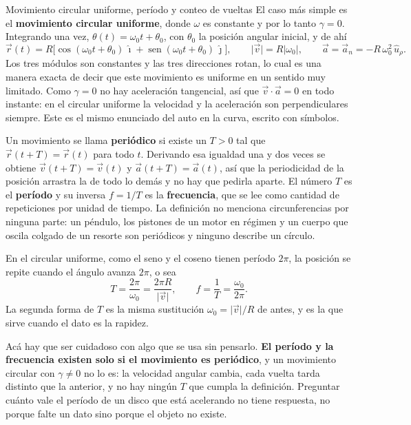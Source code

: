 \documentclass[11pt,openany]{book}
\newcommand{\sen}{\operatorname{sen}}
\begin{document}
\begin{bloque}{Movimiento circular uniforme, período y conteo de vueltas}
El caso más simple es el \textbf{movimiento circular uniforme}, donde $\omega$ es constante y por lo tanto $\gamma = 0$. Integrando una vez, $\theta(t) = \omega_0 t + \theta_0$, con $\theta_0$ la posición angular inicial, y de ahí
\[
\vec r(t) = R\big[\cos(\omega_0t+\theta_0)\,\hat\imath + \sen(\omega_0t+\theta_0)\,\hat\jmath\big],
\qquad
\lvert\vec v\rvert = R\lvert\omega_0\rvert, \qquad \vec a = \vec a_n = -R\,\omega_0^2\,\hat u_\rho.
\]
Los tres módulos son constantes y las tres direcciones rotan, lo cual es una manera exacta de decir que este movimiento es uniforme en un sentido muy limitado. Como $\gamma = 0$ no hay aceleración tangencial, así que $\vec v\cdot\vec a = 0$ en todo instante: en el circular uniforme la velocidad y la aceleración son perpendiculares siempre. Este es el mismo enunciado del auto en la curva, escrito con símbolos.

Un movimiento se llama \textbf{periódico} si existe un $T > 0$ tal que $\vec r(t+T) = \vec r(t)$ para todo $t$. Derivando esa igualdad una y dos veces se obtiene $\vec v(t+T) = \vec v(t)$ y $\vec a(t+T) = \vec a(t)$, así que la periodicidad de la posición arrastra la de todo lo demás y no hay que pedirla aparte. El número $T$ es el \textbf{período} y su inversa $f = 1/T$ es la \textbf{frecuencia}, que se lee como cantidad de repeticiones por unidad de tiempo. La definición no menciona circunferencias por ninguna parte: un péndulo, los pistones de un motor en régimen y un cuerpo que oscila colgado de un resorte son periódicos y ninguno describe un círculo.

En el circular uniforme, como el seno y el coseno tienen período $2\pi$, la posición se repite cuando el ángulo avanza $2\pi$, o sea
\[
T = \frac{2\pi}{\omega_0} = \frac{2\pi R}{\lvert\vec v\rvert}, \qquad f = \frac{1}{T} = \frac{\omega_0}{2\pi}.
\]
La segunda forma de $T$ es la misma sustitución $\omega_0 = \lvert\vec v\rvert/R$ de antes, y es la que sirve cuando el dato es la rapidez.

Acá hay que ser cuidadoso con algo que se usa sin pensarlo. \textbf{El período y la frecuencia existen solo si el movimiento es periódico}, y un movimiento circular con $\gamma \neq 0$ no lo es: la velocidad angular cambia, cada vuelta tarda distinto que la anterior, y no hay ningún $T$ que cumpla la definición. Preguntar cuánto vale el período de un disco que está acelerando no tiene respuesta, no porque falte un dato sino porque el objeto no existe.


\end{bloque}
\end{document}
